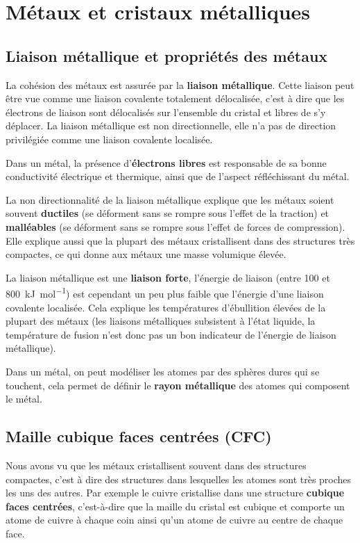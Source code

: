 \documentclass{cours}
\begin{document}
\section{Métaux et cristaux métalliques}%
\label{sec:metaux_et_cristaux_metalliques}

\subsection{Liaison métallique et propriétés des métaux}%
\label{sub:liaison_metallique_et_proprietes_des_metaux}


La cohésion des métaux est assurée par la \textbf{liaison métallique}. Cette liaison peut être vue comme une liaison covalente totalement délocalisée, c'est à dire que les électrons de liaison sont délocalisés sur l'ensemble du cristal et libres de s'y déplacer. La liaison métallique est non directionnelle, elle n'a pas de direction privilégiée comme une liaison covalente localisée.

Dans un métal, la présence d'\textbf{électrons libres} est responsable de sa bonne conductivité électrique et thermique, ainsi que de l'aspect réfléchissant du métal.

La non directionnalité de la liaison métallique explique que les métaux soient souvent \textbf{ductiles} (se déforment sans se rompre sous l'effet de la traction) et \textbf{malléables} (se déforment sans se rompre sous l'effet de forces de compression). Elle explique aussi que la plupart des métaux cristallisent dans des structures très compactes, ce qui donne aux métaux une masse volumique élevée.

La liaison métallique est une \textbf{liaison forte}, l'énergie de liaison (entre \num{100} et \SI{800}{\kilo\joule\per\mole}) est cependant un peu plus faible que l'énergie d'une liaison covalente localisée. Cela explique les températures d'ébullition élevées de la plupart des métaux (les liaisons métalliques subsistent à l'état liquide, la température de fusion n'est donc pas un bon indicateur de l'énergie de liaison métallique). 

Dans un métal, on peut modéliser les atomes par des sphères dures qui se touchent, cela permet de définir le \textbf{rayon métallique} des atomes qui composent le métal.

\subsection{Maille cubique faces centrées (CFC)}%
\label{sub:maille_cubique_faces_centrees_cfc}
Nous avons vu que les métaux cristallisent souvent dans des structures compactes, c'est à dire des structures dans lesquelles les atomes sont très proches les uns des autres. Par exemple le cuivre cristallise dans une structure \textbf{cubique faces centrées}, c'est-à-dire que la maille du cristal est cubique et comporte un atome de cuivre à chaque coin ainsi qu'un atome de cuivre au centre de chaque face. 
\end{document}

